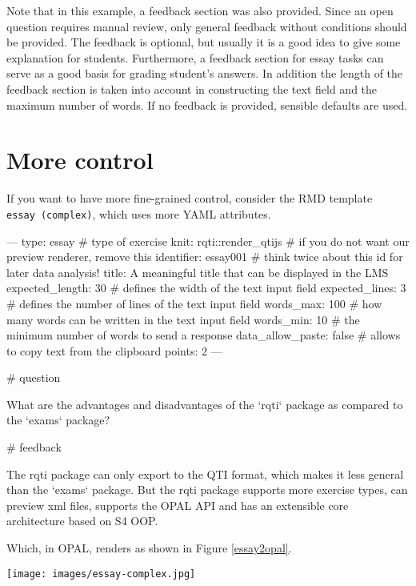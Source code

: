 \documentclass[twoside]{tufte-book}
\newenvironment{Shaded}{}{}
\begin{document}
Note that in this example, a feedback section was also provided. Since an open question requires manual review, only general feedback without conditions should be provided. The feedback is optional, but usually it is a good idea to give some explanation for students. Furthermore, a feedback section for essay tasks can serve as a good basis for grading student's answers. In addition the length of the feedback section is taken into account in constructing the text field and the maximum number of words. If no feedback is provided, sensible defaults are used.

\section{More control}\label{more-control-4}

If you want to have more fine-grained control, consider the RMD template \texttt{essay\ (complex)}, which uses more YAML attributes.

\begin{Shaded}
\begin{Highlighting}
---
type: essay # type of exercise
knit: rqti::render_qtijs # if you do not want our preview renderer, remove this
identifier: essay001 # think twice about this id for later data analysis!
title: A meaningful title that can be displayed in the LMS
expected_length: 30 # defines the width of the text input field
expected_lines: 3 # defines the number of lines of the text input field
words_max: 100 # how many words can be written in the text input field
words_min: 10 # the minimum number of words to send a response
data_allow_paste: false # allows to copy text from the clipboard
points: 2
---

# question

What are the advantages and disadvantages of the `rqti` package as compared to
the `exams` package?

# feedback

The rqti package can only export to the QTI format, which makes it less general
than the `exams` package. But the rqti package supports more exercise types, can
preview xml files, supports the OPAL API and has an extensible core architecture
based on S4 OOP.
\end{Highlighting}
\end{Shaded}

Which, in OPAL, renders as shown in Figure \ref{essay2opal}.

\begin{figure*}
\centering
\texttt{[image: images/essay-complex.jpg]}
\caption{\label{essay2opal}More complex essay task rendered in OPAL}
\end{figure*}
\end{document}
